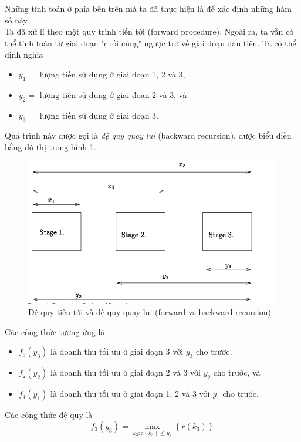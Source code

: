 \documentclass[12pt,a4paper]{article}
\begin{document}
Những tính toán ở phía bên trên mà ta đã thực hiện là để xác định những hám số này.\\
Ta đã xử lí theo một quy trình tiến tới (forward procedure). Ngoài ra, ta vẫn có thể tính toán từ giai đoạn "cuối cùng" ngược trở về giai đoạn đàu tiên. Ta có thể định nghĩa
\begin{itemize}
\item \({y_1} = \) lượng tiền sử dụng ở giai đoạn 1, 2 và 3,
\item \({y_2} = \) lượng tiền sử dụng ở giai đoạn 2 và 3, và
\item \({y_3} = \) lượng tiền sử dụng ở giai đoạn 3.
\end{itemize}
Quá trình này được gọi là \textit{đệ quy quay lui} (backward recursion), được biểu diễn bằng đồ thị trong hình \ref{hinh1}.
\begin{center}
\begin{figure}[H]
\includegraphics[scale=1]{hinh1}
\caption{Đệ quy tiến tới và đệ quy quay lui (forward vs backward recursion)}
\label{hinh1}
\end{figure}
\end{center}
Các công thức tương ứng là
\begin{itemize}
\item \({f_3}\left( {{y_3}} \right)\) là doanh thu tối ưu ở giai đoạn 3 với \(y_3\) cho trước,
\item \({f_2}\left( {{y_2}} \right)\) là doanh thu tối ưu ở giai đoạn 2 và 3 với \(y_2\) cho trước, và
\item \({f_1}\left( {{y_1}} \right)\) là doanh thu tối ưu ở giai đoạn 1, 2 và 3 với \(y_1\) cho trước.
\end{itemize}
Các công thức đệ quy là
\[{f_3}\left( {{y_3}} \right) = \mathop {\max }\limits_{{k_3}:c\left( {{k_3}} \right) \leqslant {y_3}} \left\{ {r\left( {{k_3}} \right)} \right\}\]
\end{document}
